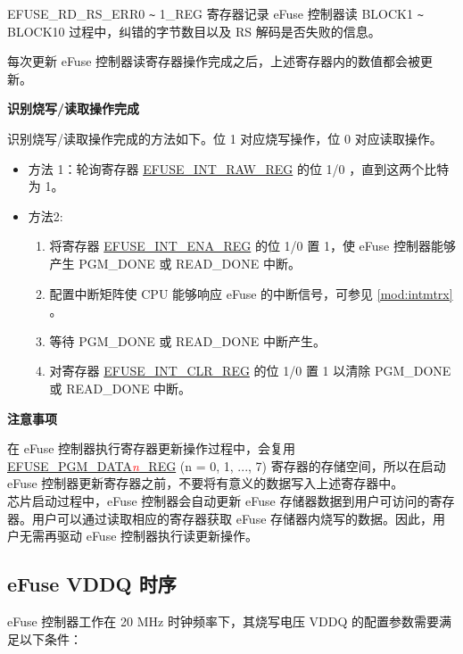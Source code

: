 \documentclass[main\_\_CN.tex]{subfiles}
\begin{document}
EFUSE\_RD\_RS\_ERR0 \verb+~+ 1\_REG 寄存器记录 eFuse 控制器读 BLOCK1 \verb+~+ BLOCK10 过程中，纠错的字节数目以及 RS 解码是否失败的信息。

每次更新 eFuse 控制器读寄存器操作完成之后，上述寄存器内的数值都会被更新。

{\bfseries 识别烧写/读取操作完成}

识别烧写/读取操作完成的方法如下。位 1 对应烧写操作，位 0 对应读取操作。

\begin{itemize}
    \item 方法 1：轮询寄存器 \hyperref[regdesc:EFUSEINTRAWREG]{EFUSE\_INT\_RAW\_REG} 的位 1/0 ，直到这两个比特为 1。
    \item 方法2:
        \begin{enumerate}
            \item 将寄存器 \hyperref[regdesc:EFUSEINTENAREG]{EFUSE\_INT\_ENA\_REG} 的位 1/0 置 1，使 eFuse 控制器能够产生 PGM\_DONE 或 READ\_DONE 中断。
            \item 配置中断矩阵使 CPU 能够响应 eFuse 的中断信号，可参见 \ref{mod:intmtrx} \textit{}。
            \item 等待 PGM\_DONE 或 READ\_DONE 中断产生。
            \item 对寄存器 \hyperref[regdesc:EFUSEINTCLRREG]{EFUSE\_INT\_CLR\_REG} 的位 1/0 置 1 以清除 PGM\_DONE 或 READ\_DONE 中断。
    \end{enumerate}
\end{itemize}

{\bfseries 注意事项}

在 eFuse 控制器执行寄存器更新操作过程中，会复用 \hyperref[regdesc:EFUSEPGMDATANREG]{EFUSE\_PGM\_DATA\textcolor{red}{\it{n}}\_REG} (n = 0, 1, ..., 7) 寄存器的存储空间，所以在启动 eFuse 控制器更新寄存器之前，不要将有意义的数据写入上述寄存器中。\\
芯片启动过程中，eFuse 控制器会自动更新 eFuse 存储器数据到用户可访问的寄存器。用户可以通过读取相应的寄存器获取 eFuse 存储器内烧写的数据。因此，用户无需再驱动 eFuse 控制器执行读更新操作。

\subsection{eFuse VDDQ 时序}
\label{sec:efuse-vddq-timing}

eFuse 控制器工作在 20 MHz 时钟频率下，其烧写电压 VDDQ 的配置参数需要满足以下条件：
\end{document}
